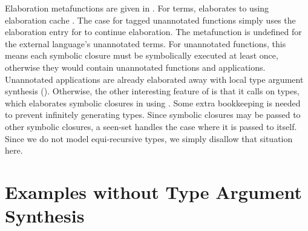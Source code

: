 Elaboration metafunctions are given in .
For terms, \ltielimClos{\ltiClosureCache{}}{\ltiE{}}{\ltiEp{}}
elaborates \ltiE{} to \ltiEp{} using elaboration cache \ltiClosureCache{}.
The case for tagged unannotated functions 
{\ltiufunelab{\ltiufunelabentry{\ltiClosureID{}}}
                                  {\ltivar{}}
                                  {\ltiE{}}}
simply uses the elaboration entry for \ltiClosureID{} to continue elaboration.
The metafunction is undefined for the external language's unannotated terms.
For unannotated functions, this means each symbolic closure must be symbolically executed at least once,
otherwise they would contain unannotated functions and applications.
Unannotated applications are already elaborated away with local type argument synthesis
().
Otherwise, the other interesting feature of \ltielimClossymbol is that it
calls \ltielimClosT{\ova{\ltiClosureID{}}}{\ltiClosureCache{}}{\ltiT{}}{\ltiTp{}} on types, which
elaborates symbolic closures in \ltiT{} using \ltiClosureCache{}.
Some extra bookkeeping is needed to prevent infinitely generating
types. Since symbolic closures may be passed to other symbolic closures,
a seen-set \ova{\ltiClosureID{}} handles the case where it is passed to itself.
Since we do not model equi-recursive types, we simply disallow that situation here.


\section{Examples without Type Argument Synthesis}

